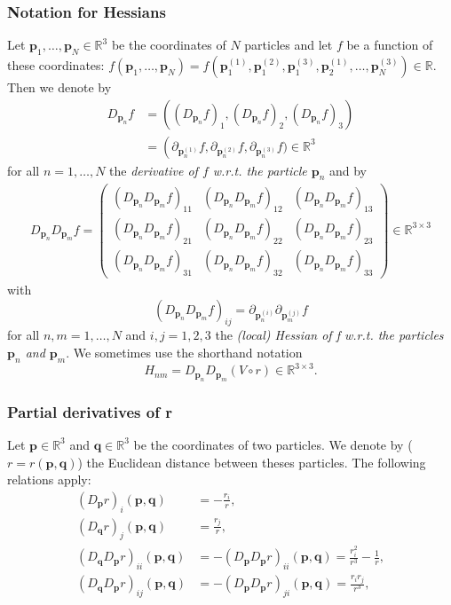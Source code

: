 \documentclass[a4paper]{article}
\newcommand{\boldp}{\boldsymbol{p}}
\newcommand{\boldq}{\boldsymbol{q}}
\newcommand{\reals}{\mathbb{R}}
\begin{document}
\subsubsection{Notation for Hessians}
\label{sec-1-1-1}
Let \(\boldp_1, \dots, \boldp_N \in \reals^3\) be the coordinates of \(N\) particles and let \(f\) be a function of these coordinates: \(f(\boldp_1, \dots, \boldp_N) = f(\boldp_1^{(1)}, \boldp_1^{(2)}, \boldp_1^{(3)}, \boldp_2^{(1)}, \dots, \boldp_N^{(3)})\in \reals\).
Then we denote by
\begin{align}
D_{\boldp_n}f &= \left((D_{\boldp_n} f)_1, (D_{\boldp_n} f)_2, (D_{\boldp_n} f)_3 \right) \\
              &= \left(\partial_{\boldp_n^{(1)}}f, \partial_{\boldp_n^{(2)}}f, \partial_{\boldp_n^{(3)}}f)\in \reals^3
\end{align}
for all \(n = 1, \dots, N\) the \emph{derivative of \(f\) w.r.t. the particle \(\boldp_n\)} and by
\begin{align}
D_{\boldp_n} D_{\boldp_m} f =
\begin{pmatrix}
(D_{\boldp_n} D_{\boldp_m}f)_{11} & (D_{\boldp_n} D_{\boldp_m}f)_{12} & (D_{\boldp_n} D_{\boldp_m}f)_{13} \\
(D_{\boldp_n} D_{\boldp_m}f)_{21} & (D_{\boldp_n} D_{\boldp_m}f)_{22} & (D_{\boldp_n} D_{\boldp_m}f)_{23} \\
(D_{\boldp_n} D_{\boldp_m}f)_{31} & (D_{\boldp_n} D_{\boldp_m}f)_{32} & (D_{\boldp_n} D_{\boldp_m}f)_{33}
\end{pmatrix}
\in \reals^{3\times 3}
\end{align}
with
\begin{equation}
(D_{\boldp_n} D_{\boldp_m}f)_{ij} = \partial_{\boldp_n^{(i)}}\partial_{\boldp_m^{(j)}} f
\end{equation}
for all \(n,m = 1, \dots, N\) and \(i,j = 1, 2, 3\) the \emph{(local) Hessian of f w.r.t. the particles \(\boldp_n\) and \(\boldp_m\)}.
We sometimes use the shorthand notation
\[
H_{nm} = D_{\boldp_n} D_{\boldp_m} (V\circ r) \in \reals^{3\times 3}.
\]


\subsubsection{Partial derivatives of r}
\label{sec-1-1-2}
Let \(\boldp \in \reals^3\) and \(\boldq \in \reals^3\) be the coordinates of two particles.
We denote by (\(r = r(\boldp, \boldq)\)) the Euclidean distance between theses particles. The following relations apply:
\begin{align}
(D_{\boldp} r)_i(\boldp, \boldq) &= - \frac{r_i}{r},  \\
(D_{\boldq} r)_j(\boldp, \boldq) &=  \frac{r_j}{r},  \\
(D_{\boldq}D_{\boldp} r)_{ii}(\boldp, \boldq) &= - (D_{\boldp}D_{\boldp} r)_{ii}(\boldp, \boldq) =  \frac{r_i^2}{r^3} - \frac{1}{r},  \\
(D_{\boldq}D_{\boldp} r)_{ij}(\boldp, \boldq) &= - (D_{\boldp}D_{\boldp} r)_{ji}(\boldp, \boldq) =  \frac{r_ir_j}{r^3}, \\
\end{align}
\end{document}
